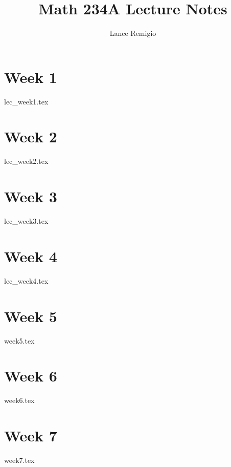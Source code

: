 \documentclass[a4paper]{report}
\title{Math 234A Lecture Notes}
\author{Lance Remigio}
\begin{document}
\maketitle    
\tableofcontents

\chapter{Week 1}

{lec_week1.tex}

\chapter{Week 2}

{lec_week2.tex}

\chapter{Week 3}

{lec_week3.tex}

\chapter{Week 4}

{lec_week4.tex}

\chapter{Week 5}

{week5.tex}

\chapter{Week 6}

{week6.tex}

\chapter{Week 7}

{week7.tex}
\end{document}
